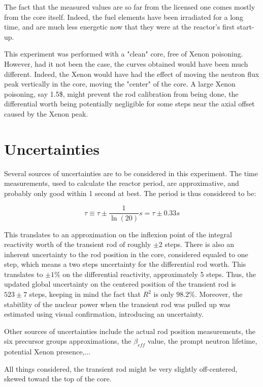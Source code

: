 The fact that the measured values are so far from the licensed one comes mostly from the core itself. Indeed, the fuel elements have been irradiated for a long time, and are much less energetic now that they were at the reactor's first start-up.


This experiment was performed with a "clean" core, free of Xenon poisoning. However, had it not been the case, the curves obtained would have been much different. Indeed, the Xenon would have had the effect of moving the neutron flux peak vertically in the core, moving the "center" of the core. A large Xenon poisoning, say 1.5\$, might prevent the rod calibration from being done, the differential worth being potentially negligible for some steps near the axial offset caused by the Xenon peak.




\section{Uncertainties}

Several sources of uncertainties are to be considered in this experiment. The time measurements, used to calculate the reactor period, are approximative, and probably only good within 1 second at best. The period is thus considered to be:

\begin{equation}\label{eq9}
\tau \equiv \tau \pm \frac{1}{\ln(20)} s = \tau \pm 0.33 s
\end{equation}

This translates to an approximation on the inflexion point of the integral reactivity worth of the transient rod of roughly $\pm 2$ steps. There is also an inherent uncertainty to the rod position in the core, considered equaled to one step, which means a two steps uncertainty for the differential rod worth. This translates to $\pm 1\%$ on the differential reactivity, approximately 5 steps. Thus, the updated global uncertainty on the centered position of the transient rod is $523 \pm 7$ steps, keeping in mind the fact that $R^2$ is only $98.2\%$. Moreover, the stabitlity of the nuclear power when the transient rod was pulled up was estimated using visual confirmation, introducing an uncertainty.

Other sources of uncertainties include the actual rod position measurements, the six precursor groups approximations, the $\beta_{eff}$ value, the prompt neutron lifetime, potential Xenon presence,...

All things considered, the transient rod might be very slightly off-centered, skewed toward the top of the core.
